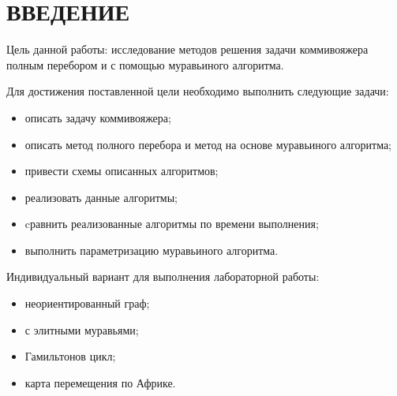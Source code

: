 \chapter*{ВВЕДЕНИЕ}
Цель данной работы: исследование методов решения задачи коммивояжера полным перебором и с помощью муравьиного алгоритма.

Для достижения поставленной цели необходимо выполнить следующие задачи:
\begin{itemize}
	\item описать задачу коммивояжера;
	\item описать метод полного перебора и метод на основе муравьиного алгоритма;
	\item привести схемы описанных алгоритмов;
	\item реализовать данные алгоритмы;
	\item cравнить реализованные алгоритмы по времени выполнения;
	\item выполнить параметризацию муравьиного алгоритма.
\end{itemize}

Индивидуальный вариант для выполнения лабораторной работы:
\begin{itemize}
	\item неориентированный граф;
	\item с элитными муравьями;
	\item Гамильтонов цикл;
	\item карта перемещения по Африке.
\end{itemize}